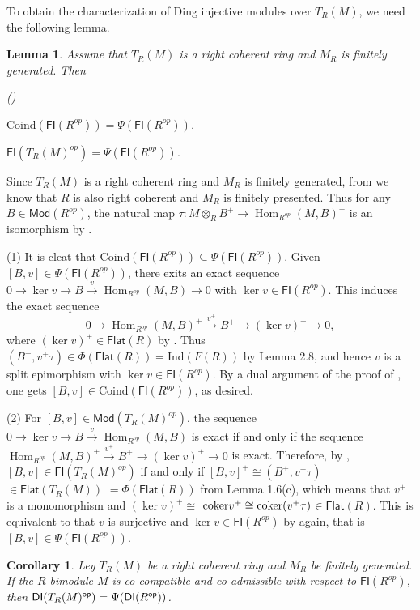 \documentclass[10pt,twoside]{amsart}
\theoremstyle{bfupright head,slanted body}
\theoremstyle{bfupright head,upright body}
\theoremstyle{fixed bf head,slanted body}
\newtheorem{cor}[res]{Corollary}        \newtheorem*{cor*}{Corollary}
\newtheorem{lem}[res]{Lemma}            \newtheorem*{lem*}{Lemma}
\theoremstyle{fixed bf head,upright body}
\theoremstyle{numbered paragraph}
\newlength{\thmlistleft}        %
\newlength{\thmlistright}       %
\newlength{\thmlistpartopsep}   %
\newlength{\thmlisttopsep}      %
\newlength{\thmlistparsep}      %
\newlength{\thmlistitemsep}     %
\newcounter{prt}
\newenvironment{prt}{\begin{list}{\upshape (\alph{prt})}%
    {\usecounter{prt}%
      \setlength{\leftmargin}{\thmlistleft}%
      \setlength{\labelwidth}{\thmlistleft}%
      \setlength{\rightmargin}{\thmlistright}%
      \setlength{\partopsep}{\thmlistpartopsep}%
      \setlength{\topsep}{\thmlisttopsep}%
      \setlength{\parsep}{\thmlistparsep}%
      \setlength{\itemsep}{\thmlistitemsep}}}%
  {\end{list}}%
\newenvironment{prf*}[1][Proof]{%
  \begin{proof}[\bf #1]
    \setcounter{equation}{0}
    \renewcommand{\theequation}{\arabic{equation}}}
  {\end{proof}
  }
\numberwithin{equation}{res}
\newcommand{\DI}{\mathsf{DI}}
\newcommand{\Flat}{\mathsf{Flat}}
\newcommand{\FI}{\mathsf{FI}}
\newcommand{\Mod}{\mathsf{Mod}}
\newcommand{\Coind}{\mathrm{Coind}}
\newcommand{\Ind}{\mathrm{Ind}}
\newcommand{\Rop}{R^{\sf op}}
\newcommand{\op}{\sf op}
\newcommand{\cok}{\mbox{\rm coker}}
\newcommand{\Hom}{\operatorname{Hom}}
\begin{document}
To obtain the characterization of Ding injective modules over $T_R(M)$,
we need the following lemma.


\begin{lem} \label{homological modules}
Assume that $T_R(M)$ is a right coherent ring and $M_{R}$ is finitely generated. Then
\begin{prt}
\item[(1)] 
$\Coind(\FI(R^{op}))=\Psi(\FI(R^{op}))$.
\item[(2)] 
$\FI(T_R(M)^{op}) = \Psi(\FI(R^{op}))$.
\end{prt}
\end{lem}

\begin{prf*}
 Since $T_R(M)$ is a right coherent ring and $M_{R}$ is finitely generated, 
from \cite[Theorem 3.5]{DL} we know that $R$ is also right coherent and $M_{R}$ is finitely presented. Thus for any $B\in \Mod(R^{op})$, the natural map $\tau: M\otimes_{R} B^{+}\to \Hom_{R^{op}}(M, B)^{+}$ is an isomorphism by \cite[Lemma 3.55(ii)]{Rot}.

(1) It is cleat that $\Coind(\FI(R^{op}))\subseteq\Psi(\FI(R^{op}))$.
Given $[B, v]\in \Psi(\FI(R^{op}))$, there exits an exact sequence $0\to \ker v\to B\overset{v}\to\Hom_{R^{op}}(M, B)\to 0$
with $\ker v\in\FI(R^{op})$. This induces the exact sequence $$0\to\Hom_{R^{op}}(M, B)^{+}\overset{v^{+}}\to B^{+}\to (\ker v)^{+}\to 0,$$ where $(\ker v)^{+}\in\Flat(R)$ by \cite[Theorem 2.2]{Fi}.
Thus $(B^{+}, v^{+}\tau)\in\Phi(\Flat(R))=\Ind(F(R))$ by Lemma 2.8,
and hence $v$ is a split epimorphism with $\ker v\in \FI(R^{op})$.
By a dual argument of the proof of \cite[Lemma 2.3]{CL},
one gets $[B, v]\in\Coind(\FI(R^{op}))$, as desired.

(2) For $[B, v]\in\Mod(T_R(M)^{op})$, the sequence $0\to \ker v\to B\overset{v}\to\Hom_{R^{op}}(M, B)$ is exact 
if and only if the sequence $\Hom_{R^{op}}(M, B)^{+}\overset{v^{+}}\to B^{+}\to (\ker v)^{+}\to 0$ is exact.
Therefore, by \cite[Theorem 2.2]{Fi}, $[B, v]\in\FI(T_R(M)^{op})$ if and only if $[B, v]^{+}\cong(B^{+}, v^{+}\tau)$ $\in\Flat(T_R(M))$
$=\Phi(\Flat(R))$ from Lemma 1.6(c),
which means that $v^{+}$ is a monomorphism and $(\ker v)^{+}\cong$ $\cok v^{+}\cong\cok (v^{+}\tau)$$\in\Flat(R)$.
This is equivalent to that  $v$ is surjective and $\ker v\in\FI(R^{op})$  by \cite[Theorem 2.2]{Fi} again,
that is $[B, v]\in\Psi(\FI(R^{op}))$.
\end{prf*}

\begin{cor} \label{THM GITRM = Psi cons}
Ley $T_R(M)$ be a right coherent ring and $M_{R}$ be finitely generated.
If the $R$-bimodule $M$ is co-compatible and co-admissible with respect to $\FI(R^{op})$, 
then $\DI(T_R(M)^{\op}) = \Psi(\DI(\Rop))$.
\end{cor}
\end{document}
